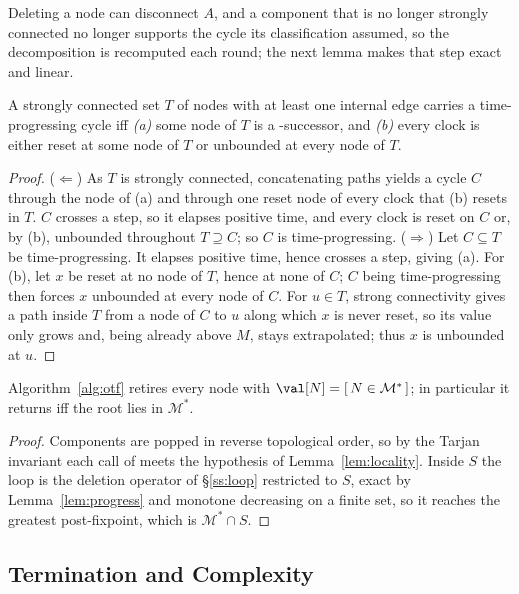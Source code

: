 \noindent
Deleting a node can disconnect $A$, and a component that is no longer strongly connected no longer
supports the cycle its classification assumed, so the decomposition is recomputed each round; the
next lemma makes that step exact and linear.

\begin{lemma}[Progress]\label{lem:progress}
A strongly connected set $T$ of nodes with at least one internal edge carries a time-progressing
cycle iff \emph{(a)} some node of $T$ is a -successor, and \emph{(b)} every clock is
either reset at some node of $T$ or unbounded at every node of $T$.
\end{lemma}
\begin{proof}
($\Leftarrow$) As $T$ is strongly connected, concatenating paths yields a cycle $C$ through the node
of (a) and through one reset node of every clock that (b) resets in $T$. $C$ crosses a
 step, so it elapses positive time, and every clock is reset on $C$ or, by (b),
unbounded throughout $T\supseteq C$; so $C$ is time-progressing.
($\Rightarrow$) Let $C\subseteq T$ be time-progressing. It elapses positive time, hence crosses a
 step, giving (a). For (b), let $x$ be reset at no node of $T$, hence at none of $C$;
$C$ being time-progressing then forces $x$ unbounded at every node of $C$. For $u\in T$, strong
connectivity gives a path inside $T$ from a node of $C$ to $u$ along which $x$ is never reset, so its
value only grows and, being already above $M$, stays extrapolated; thus $x$ is unbounded at $u$.
\end{proof}

\begin{lemma}[Adequacy]\label{lem:alg}
Algorithm~\ref{alg:otf} retires every node with $\val[N]=[\,N\in\mathcal M^{*}\,]$; in
particular it returns \SAT{} iff the root lies in $\mathcal M^{*}$.
\end{lemma}
\begin{proof}
Components are popped in reverse topological order, so by the Tarjan invariant each call of \Eliminate{}
meets the hypothesis of Lemma~\ref{lem:locality}. Inside $S$ the loop is the deletion operator of
\S\ref{ss:loop} restricted to $S$, exact by Lemma~\ref{lem:progress} and monotone
decreasing on a finite set, so it reaches the greatest post-fixpoint, which is $\mathcal M^{*}\cap S$.
\end{proof}

\subsection{Termination and Complexity}\label{ss:term}

